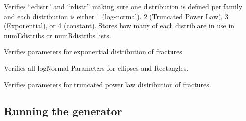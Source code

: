\documentclass[letterpaper,10pt,english]{sphinxmanual}
\begin{document}
\begin{fulllineitems}
\begin{fulllineitems}
\end{fulllineitems}


\begin{fulllineitems}
\label{pydfnworks:pydfnworks.distributions.distr.distr}
Verifies ``edistr'' and ``rdistr'' making sure one distribution is defined per family and
each distribution is either 1 (log-normal), 2 (Truncated Power Law), 3 (Exponential), or 4 (constant).
Stores how many of each distrib are in use in numEdistribs or numRdistribs lists.

\end{fulllineitems}


\begin{fulllineitems}
\label{pydfnworks:pydfnworks.distributions.distr.exponential_dist}
Verifies parameters for exponential distribution of fractures.

\end{fulllineitems}


\begin{fulllineitems}
\label{pydfnworks:pydfnworks.distributions.distr.lognormal_dist}
Verifies all logNormal Parameters for ellipses and Rectangles.

\end{fulllineitems}


\begin{fulllineitems}
\label{pydfnworks:pydfnworks.distributions.distr.tpl_dist}
Verifies parameters for truncated power law distribution of fractures.

\end{fulllineitems}


\end{fulllineitems}



\subsection{Running the generator}
\label{pydfnworks:running-the-generator}\label{pydfnworks:module-pydfnworks.generator}
\end{document}
